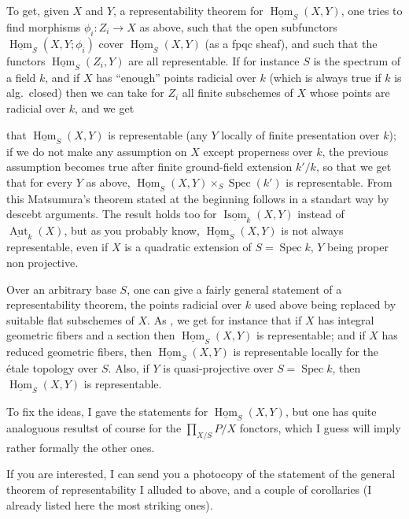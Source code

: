 \documentclass[11pt,a4paper]{article}
\begin{document}
To get, given $X$ and $Y$, a representability theorem for
$\underline{\operatorname{Hom}}_S(X,Y)$,  one tries to find
morphisms $\phi_i : Z_i \to X$ as above, such that the open subfunctors
$\underline{\operatorname{Hom}}_S(X,Y;\phi_i)$ cover
$\underline{\operatorname{Hom}}_S(X,Y)$ (as a fpqc sheaf), and such that the
functors $\underline{\operatorname{Hom}}_S(Z_i,Y)$ are all representable. If for
instance $S$ is the spectrum of a field $k$, and if $X$ has ``enough'' points
radicial over $k$ (which is always true if $k$ is alg.\ closed) then we can take
for $Z_i$ all finite subschemes of $X$ whose points are radicial over $k$, and
we get

that $\underline{\operatorname{Hom}}_S(X,Y)$ is representable (any $Y$ locally
of finite presentation  over $k$); if we do not make any
assumption on $X$ except properness over $k$, the previous assumption becomes
true after finite ground-field extension $k'/k$, so that we get that for every
$Y$ as above, $\underline{\operatorname{Hom}}_S(X,Y) \times_S \operatorname{Spec}(k')$
is representable. From this Matsumura's theorem stated at the beginning follows
in a standart way by descebt arguments. The result holds too for
$\underline{\operatorname{Isom}}_k(X,Y)$ instead of
$\underline{\operatorname{Aut}}_k(X)$, but as you probably know,
$\underline{\operatorname{Hom}}_S(X,Y)$ is not always representable, even if $X$
is a quadratic extension of $S = \operatorname{Spec} k$, $Y$ being proper non
projective.

Over an arbitrary base $S$, one can give a fairly general statement of a
representability theorem, the points radicial over $k$ used above being
replaced by suitable flat subschemes of $X$. As 
, we get for instance that if $X$ has integral geometric
fibers and a section  then
$\underline{\operatorname{Hom}}_S(X,Y)$ is representable; and if $X$ has reduced
geometric fibers, then $\underline{\operatorname{Hom}}_S(X,Y)$ is representable
locally for the étale topology over $S$. Also, if $Y$ is quasi-projective over
$S = \operatorname{Spec} k$, then $\underline{\operatorname{Hom}}_S(X,Y)$ is
representable.

To fix the ideas, I gave the statements for
$\underline{\operatorname{Hom}}_S(X,Y)$, but one has quite analoguous resultst
of course for the $\prod_{X/S} P/X$ fonctors, which I guess will imply rather
formally the other ones.

If you are interested, I can send you a photocopy of the statement of the
general theorem of representability I alluded to above, and a couple of
corollaries (I already listed here the most striking ones).
\end{document}
